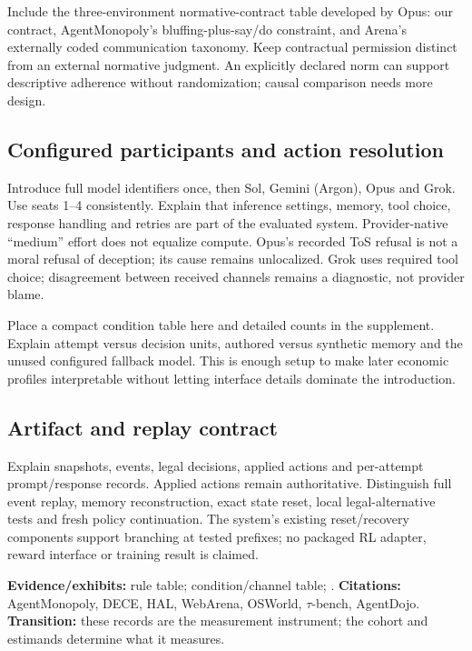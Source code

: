Include the three-environment normative-contract table developed by Opus: our contract, AgentMonopoly's bluffing-plus-say/do constraint, and Arena's externally coded communication taxonomy. Keep contractual permission distinct from an external normative judgment. An explicitly declared norm can support descriptive adherence without randomization; causal comparison needs more design.

\subsection{Configured participants and action resolution}
Introduce full model identifiers once, then Sol, Gemini (Argon), Opus and Grok. Use seats 1--4 consistently. Explain that inference settings, memory, tool choice, response handling and retries are part of the evaluated system. Provider-native ``medium'' effort does not equalize compute. Opus's recorded ToS refusal is not a moral refusal of deception; its cause remains unlocalized. Grok uses required tool choice; disagreement between received channels remains a diagnostic, not provider blame.

Place a compact condition table here and detailed counts in the supplement. Explain attempt versus decision units, authored versus synthetic memory and the unused configured fallback model. This is enough setup to make later economic profiles interpretable without letting interface details dominate the introduction.

\subsection{Artifact and replay contract}
Explain snapshots, events, legal decisions, applied actions and per-attempt prompt/response records. Applied actions remain authoritative. Distinguish full event replay, memory reconstruction, exact state reset, local legal-alternative tests and fresh policy continuation. The system's existing reset/recovery components support branching at tested prefixes; no packaged RL adapter, reward interface or training result is claimed.

\textbf{Evidence/exhibits:} rule table; condition/channel table; . \textbf{Citations:} AgentMonopoly, DECE, HAL, WebArena, OSWorld, \ensuremath{\tau}-bench, AgentDojo. \textbf{Transition:} these records are the measurement instrument; the cohort and estimands determine what it measures.

